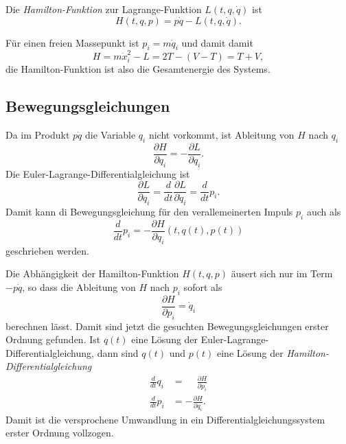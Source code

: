 \begin{definition}
Die {\em Hamilton-Funktion} zur Lagrange-Funktion $L(t,q,\dot{q})$ ist
\[
H(t,q,p)
=
p\dot{q}
-
L(t,q,\dot{q}).
\]
\end{definition}

Für einen freien Massepunkt ist $p_i = m\dot{q}_i$ und damit damit
\[
H=
m\dot{x}_i^2
-
L
=
2T
-
(V-T)
=
T+V,
\]
die Hamilton-Funktion ist also die Gesamtenergie des Systems.

%
%
\subsection{Bewegungsgleichungen}
Da im Produkt $p\dot{q}$ die Variable $q_i$ nicht vorkommt, ist
Ableitung von $H$ nach $q_i$
\[
\frac{\partial H}{\partial q_i}
=
-
\frac{\partial L}{\partial q_i}.
\]
Die Euler-Lagrange-Differentialgleichung ist
\[
\frac{\partial L}{\partial q_i}
=
\frac{d}{dt}\frac{\partial L}{\partial \dot{q}_i}
=
\frac{d}{dt} p_i.
\]
Damit kann di Bewegungsgleichung für den verallemeinerten Impuls $p_i$ auch als
\[
\frac{d}{dt}p_i
=
-
\frac{\partial H}{\partial q_i}(t,q(t),p(t))
\]
geschrieben werden.

Die Abhängigkeit der Hamilton-Funktion $H(t,q,p)$ äusert sich nur im Term
$-p\dot{q}$, so dass die Ableitung von $H$ nach $p_i$ sofort als
\[
\frac{\partial H}{\partial p_i}
=
\dot{q}_i
\]
berechnen lässt.
Damit sind jetzt die gesuchten Bewegungsgleichungen erster Ordnung gefunden.
Ist $q(t)$ eine Lösung der Euler-Lagrange-Differentialgleichung, dann sind
$q(t)$ und $p(t)$ eine Lösung der {\em Hamilton-Differentialgleichung}
\begin{align*}
\frac{d}{dt} q_i
&=
\phantom{-}\frac{\partial H}{\partial p_i}
\\
\frac{d}{dt} p_i
&=
-
\frac{\partial H}{\partial q_i}.
\end{align*}
Damit ist die versprochene Umwandlung in ein Differentialgleichungssystem
erster Ordnung vollzogen.


